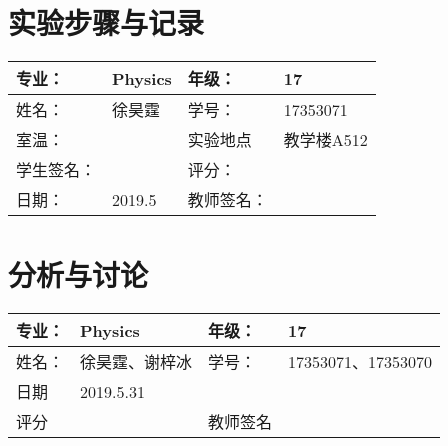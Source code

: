\documentclass[utf8]{article}
\begin{document}
                
\newpage
\section{实验步骤与记录}
\begin{tabular}{|p{9em}|p{9em}|p{9em}|p{9em}|}
	\hline 
	专业：     &Physics       &年级：      & 17     \\
	\hline
	姓名：& 徐昊霆 &学号：&17353071  \\
	\hline
	室温：&                    &实验地点 & 教学楼A512 \\
	\hline	
	学生签名： & & 评分： & \\
	\hline
	日期： & 2019.5 & 教师签名：&  \\
	\hline
\end{tabular}

\newpage
\section{分析与讨论}
\begin{tabular}{|p{9em}|p{9em}|p{9em}|p{9em}|}
	\hline 
	专业：     &Physics       &年级：      & 17     \\
	\hline
	姓名：& 徐昊霆、谢梓冰 &学号：&17353071、17353070  \\
	\hline
	日期&     2019.5.31               & &  \\
	\hline	
	评分 & & 教师签名 & \\
	\hline
\end{tabular}
\end{document}
